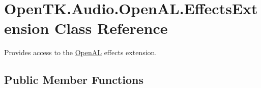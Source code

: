 \hypertarget{class_open_t_k_1_1_audio_1_1_open_a_l_1_1_effects_extension}{\section{Open\-T\-K.\-Audio.\-Open\-A\-L.\-Effects\-Extension Class Reference}
\label{class_open_t_k_1_1_audio_1_1_open_a_l_1_1_effects_extension}
}


Provides access to the \hyperlink{namespace_open_t_k_1_1_audio_1_1_open_a_l}{Open\-A\-L} effects extension.  


\subsection*{Public Member Functions}
